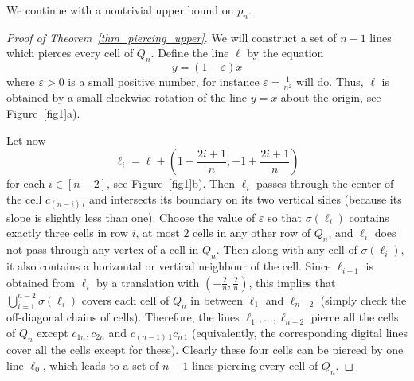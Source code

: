 \documentclass[11pt,a4paper]{amsart}
\newcommand{\eps}{\varepsilon}
\begin{document}
\medskip
We continue with a nontrivial upper bound on $p_n$.


\begin{proof}[Proof of Theorem~\ref{thm_piercing_upper}]
We will construct a set of $n-1$ lines which pierces every cell of $Q_n$.
Define the line $\ell$ by the equation
\[
y =  (1 - \eps) x
\]
where $\eps >0$ is a small positive number, for instance $\eps=\frac 1{n^2}$ will do.
Thus, $\ell$ is obtained by a small clockwise rotation of the line $y=x$ about the origin, see Figure~\ref{fig1}a).


   Let now
\[
\ell_i = \ell + \left(1 - \frac {2i+1}{n}, -1 + \frac {2i+1}{n} \right)
\]
for each $i \in [n-2]$,  see Figure~\ref{fig1}b). Then $\ell_i$ passes through the center of the cell $c_{(n-i) \, i}$  and intersects its boundary on its two vertical sides (because its slope is slightly less than one). Choose the value of $\eps$  so that $\sigma(\ell_i)$ contains exactly three cells in row $i$, at most $2$ cells in any other row of $Q_n$, and $\ell_i$ does not pass through any vertex of a cell in $Q_n$. Then along with any cell of $\sigma(\ell_i)$, it also contains a horizontal or vertical neighbour of the cell. Since $\ell_{i+1}$ is obtained from $\ell_{i}$ by a translation with $(-\frac 2 n, \frac 2 n )$, this implies that $\bigcup_{i=1}^{n-2}\sigma(\ell_i)$ covers each cell of $Q_n$ in between $\ell_1$ and $\ell_{n-2}$ (simply check the off-diagonal chains of cells). Therefore, the lines $\ell_1, \ldots, \ell_{n-2}$ pierce all the cells of $Q_n$ except $c_{1n},c_{2n}$ and $c_{(n-1)\, 1}c_{n \,1}$ (equivalently, the corresponding digital lines cover all the cells except for these). Clearly these four cells can be pierced by one line $\ell_0$, which leads to a set of $n-1$ lines piercing every cell of $Q_n$.
\end{proof}
\end{document}
